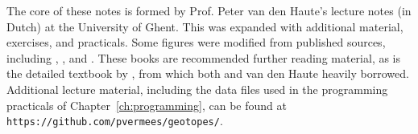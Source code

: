 \begin{refsection}
The core of these notes is formed by Prof. Peter van den Haute's
lecture notes (in Dutch) at the University of Ghent.  This was
expanded with additional material, exercises, and practicals. Some
figures were modified from published sources,
including \citet{allegre2008}, \citet{braun2006},
and \citet{galbraith2005}. These books are recommended further reading
material, as is the detailed textbook by \citet{dickin2005}, from
which both \citet{allegre2008} and van den Haute heavily
borrowed. Additional lecture material, including the data files used
in the programming practicals of Chapter~\ref{ch:programming}, can be
found at \texttt{https://github.com/pvermees/geotopes/}.

\printbibliography[heading=subbibliography]
\end{refsection}
